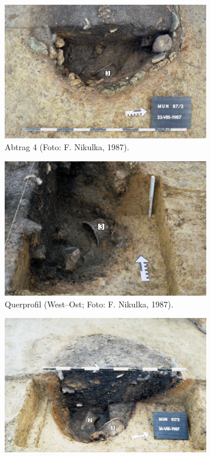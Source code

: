 \begin{figure}[p]
	\centering
	\begin{subfigure}{\columnwidth}
		\includegraphics[width = \textwidth]{fig/MUN87-211-3_F87-02-27.pdf}
		\caption{Abtrag 4 (Foto: F. Nikulka, 1987).}
		\label{fig:MUN87-211-3_F87-02-27}
	\end{subfigure}\hfill
	\begin{subfigure}{\columnwidth}
		\includegraphics[width = \textwidth]{fig/MUN87-211-4_F87-02-30.pdf}
		\caption{Querprofil (West--Ost; Foto: F. Nikulka, 1987).}
		\label{fig:MUN87-211-4_F87-02-36}
	\end{subfigure}
	\begin{subfigure}{\columnwidth}
		\centering
		\includegraphics[width = \textwidth]{fig/MUN87-211-5_E87-041-26.pdf}

\end{subfigure}
\end{figure}
